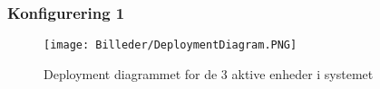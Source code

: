 \documentclass[Main.tex]{subfiles}
\begin{document}
\subsubsection{Konfigurering 1}

\begin{figure}[H]
\begin{center}
\texttt{[image: Billeder/DeploymentDiagram.PNG]} 
\end{center}
\caption{Deployment diagrammet for de 3 aktive enheder i systemet}
\end{figure}
\end{document}

